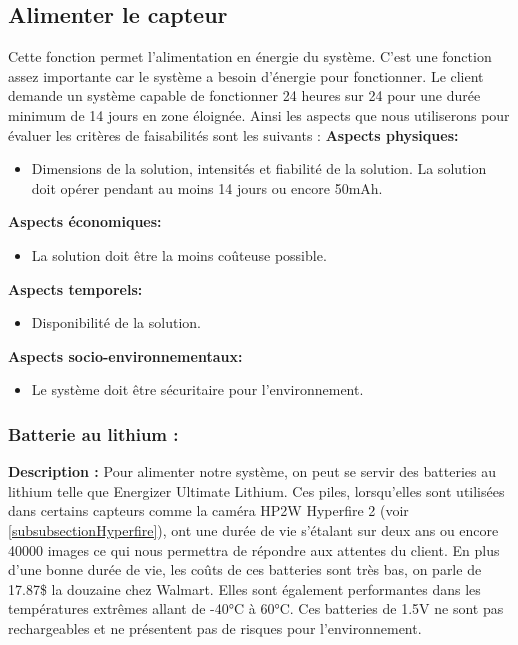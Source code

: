 \subsection{Alimenter le capteur}
 Cette fonction permet l'alimentation en énergie du système. C'est une fonction assez importante car le système a besoin d'énergie pour fonctionner. Le client demande un système capable de fonctionner 24 heures sur 24 pour une durée minimum de 14 jours en zone éloignée. Ainsi les aspects que nous utiliserons pour évaluer les critères de faisabilités sont les suivants : 
 \textbf{Aspects physiques:}
 \begin{itemize} [label = {--}]
    \item Dimensions de la solution, intensités et fiabilité de la solution. La solution doit opérer pendant au moins 14 jours ou encore 50mAh.
\end{itemize}
 \textbf{Aspects économiques:}
 \begin{itemize} [label = {--}]
    \item La solution doit être la moins coûteuse possible.
\end{itemize}
 \textbf{Aspects temporels:}
 \begin{itemize} [label = {--}]
    \item Disponibilité de la solution.
\end{itemize}
 \textbf{Aspects socio-environnementaux:}
 \begin{itemize} [label = {--}]
    \item Le système doit être sécuritaire pour l'environnement.
\end{itemize}
\subsubsection{Batterie au lithium :}

\textbf{Description :}
Pour alimenter notre système, on peut se servir des batteries au lithium telle que Energizer Ultimate Lithium. Ces piles, lorsqu'elles sont utilisées dans certains capteurs comme la caméra HP2W Hyperfire 2 (voir \ref{subsubsectionHyperfire}), ont une durée de vie s'étalant sur deux ans ou encore 40000 images ce qui nous permettra de répondre aux attentes du client. En plus d'une bonne durée de vie, les coûts de ces batteries sont très bas, on parle de 17.87\$ la douzaine chez Walmart. Elles sont également performantes dans les températures extrêmes allant de -40°C à 60°C. Ces batteries de 1.5V ne sont pas rechargeables et ne présentent pas de risques pour l'environnement.
 
